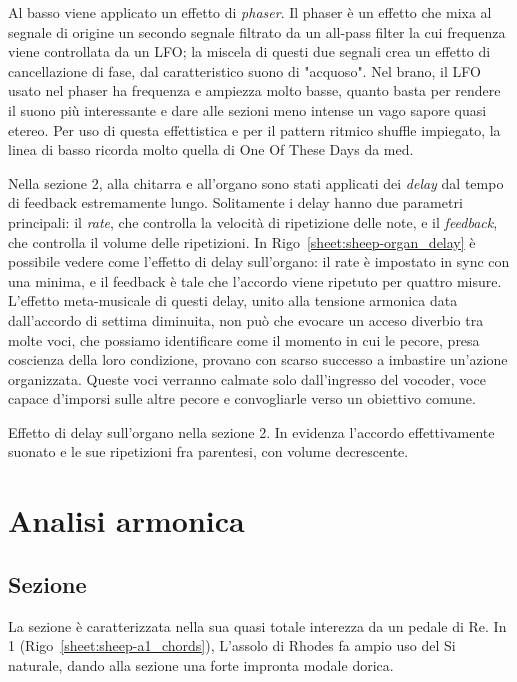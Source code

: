 \documentclass[class=book, crop=false, oneside, 12pt]{standalone}
\begin{document}
    Al basso viene applicato un effetto di \emph{phaser}. Il phaser è un effetto che mixa al segnale di origine un secondo segnale filtrato da un all-pass filter la cui frequenza viene controllata da un LFO; la miscela di questi due segnali crea un effetto di cancellazione di fase, dal caratteristico suono di "acquoso". Nel brano, il LFO usato nel phaser ha frequenza e ampiezza molto basse, quanto basta per rendere il suono più interessante e dare alle sezioni meno intense un vago sapore quasi etereo. Per uso di questa effettistica e per il pattern ritmico shuffle impiegato, la linea di basso ricorda molto quella di One Of These Days da \acrshort{med}.

    Nella sezione 2, alla chitarra e all'organo sono stati applicati dei \emph{delay} dal tempo di feedback estremamente lungo. Solitamente i delay hanno due parametri principali: il \emph{rate}, che controlla la velocità di ripetizione delle note, e il \emph{feedback}, che controlla il volume delle ripetizioni. In Rigo~\ref{sheet:sheep-organ_delay} è possibile vedere come l'effetto di delay sull'organo: il rate è impostato in sync con una minima, e il feedback è tale che l'accordo viene ripetuto per quattro misure. L'effetto meta-musicale di questi delay, unito alla tensione armonica data dall'accordo di settima diminuita, non può che evocare un acceso diverbio tra molte voci, che possiamo identificare come il momento in cui le pecore, presa coscienza della loro condizione, provano con scarso successo a imbastire un'azione organizzata. Queste voci verranno calmate solo dall'ingresso del vocoder, voce capace d'imporsi sulle altre pecore e convogliarle verso un obiettivo comune.

    \begin{sheet}[htb]
        \centering
        \caption[Effetto di delay sull'organo.]{Effetto di delay sull'organo nella sezione 2. In evidenza l'accordo effettivamente suonato  e le sue ripetizioni fra parentesi, con volume decrescente.}
        \label{sheet:sheep-organ_delay}
    \end{sheet}

    \section{Analisi armonica}
    \label{sec:04-harmony}

    \subsection{Sezione }
    La sezione  è caratterizzata nella sua quasi totale interezza da un pedale di Re. In 1 (Rigo~\ref{sheet:sheep-a1_chords}), L'assolo di Rhodes fa ampio uso del Si naturale, dando alla sezione una forte impronta modale dorica.     
    
\end{document}
